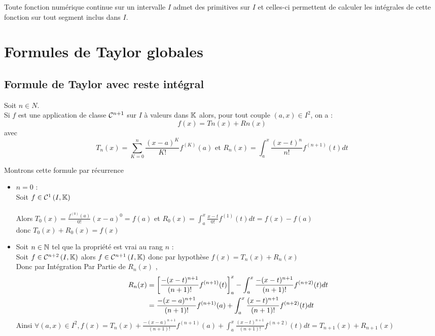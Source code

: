 \begin{defprop}
    Toute fonction numérique continue sur un intervalle \(I\) admet des primitives sur \(I\) et celles-ci permettent de calculer les intégrales de cette fonction sur tout segment inclus dans \(I\).
\end{defprop}
\section{Formules de Taylor globales}
\subsection{Formule de Taylor avec reste intégral}
\begin{defprop}
    Soit \(n \in  N\). \\
    Si \(f\) est une application de classe \(\cal{C}^{n+1}\) sur \(I\) à valeurs dans \(\K\) alors, pour tout couple \((a, x) \in  I^2\), on a :
    \[f (x) = Tn(x) + Rn(x)\]
    avec
    \[ T_n(x) = \sum^n_{K=0}\frac{(x -  a)^K}{K!} f^{(K)}(a) \text{ et } R_n(x) =\int^x_a \frac{(x -  t)^n}{n!} f^{(n+1)}(t) dt\]
\end{defprop}
\begin{dem}
    Montrons cette formule par récurrence
    \begin{itemize}
        \item \(n = 0\) : \\
        Soit \(f \in \cal{C}^1\paren{I,\K} \)\\~\\
        Alors \(T_0(x) = \frac{f^{(0)}(a)}{0!} (x-a)^{0} = f(a)\) et \(R_0(x) = \int_a^x\frac{x-t}{0!}f^{(1)}(t)dt = f(x)-f(a)\) \\
        donc \(T_0(x) + R_0(x) = f(x)\)
        \item Soit \(n \in \N\) tel que la propriété est vrai au rang \(n\) :\\
        Soit \(f\in \cal{C}^{n+2}\paren{I,\K}\) alors \(f\in \cal{C}^{n+1}\paren{I,\K}\) donc par hypothèse \(f(x) = T_n(x ) + R_n(x)\)\\
        Donc par Intégration Par Partie de \(R_n(x)\) ,\begin{align*}
            R_n(x) &= \croch{\frac{-(x-t)^{n+1}}{(n+1)!}f^{(n+1)}(t)}^x_a - \int_{a}^x \frac{-(x-t)^{n+1}}{(n+1)!}f^{(n+2)}(t)dt \\
            & = \frac{-(x-a)^{n+1}}{(n+1)!}f^{(n+1)}(a) + \int_{a}^x \frac{(x-t)^{n+1}}{(n+1)!}f^{(n+2)}(t)dt\\
        \end{align*} 
        Ainsi \(\forall (a,x) \in I^2, f(x) = T_n(x ) + \frac{-(x-a)^{n+1}}{(n+1)!}f^{(n+1)}(a) + \int_{a}^x \frac{(x-t)^{n+1}}{(n+1)!}f^{(n+2)}(t)dt = T_{n+1}(x) + R_{n+1}(x)\) 
    \end{itemize}
\end{dem}
